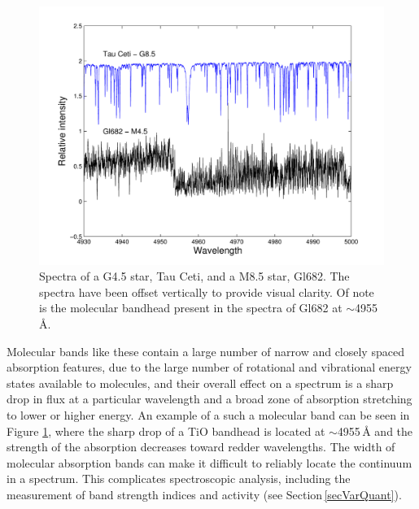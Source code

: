 \begin{figure}
\centering
\includegraphics[width=\textwidth]{TauCetiGl682_comparison.pdf}
\caption{Spectra of a G4.5 star, Tau Ceti, and a M8.5 star, Gl682. The spectra have been offset vertically to provide visual clarity. Of note is the molecular bandhead present in the spectra of Gl682 at $\sim$4955\,\hbox{\AA}.}
\label{figSpec}
\end{figure}

Molecular bands like these contain a large number of narrow and closely spaced absorption features, due to the large number of rotational and vibrational energy states available to molecules, and their overall effect on a spectrum is a sharp drop in flux at a particular wavelength and a broad zone of absorption stretching to lower or higher energy. An example of a such a molecular band can be seen in Figure \ref{figSpec}, where the sharp drop of a TiO bandhead is located at $\sim$4955\,\hbox{\AA} and the strength of the absorption decreases toward redder wavelengths. The width of molecular absorption bands can make it difficult to reliably locate the continuum in a spectrum. This complicates spectroscopic analysis, including the measurement of band strength indices and activity (see Section\,\ref{secVarQuant}).\\

